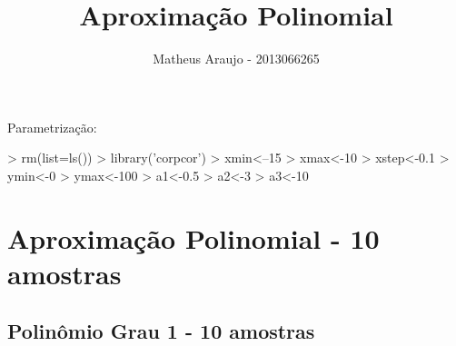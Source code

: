 \documentclass{article}
\begin{document}


\title{Aproximação Polinomial}
\author{Matheus Araujo - 2013066265}
\date{}

\maketitle

Parametrização:

\begin{Schunk}
\begin{Sinput}
>   rm(list=ls())
>   library('corpcor')
>   xmin<--15
>   xmax<-10
>   xstep<-0.1
>   ymin<-0
>   ymax<-100
>   a1<-0.5
>   a2<-3
>   a3<-10
\end{Sinput}
\end{Schunk}

\newpage
\section{Aproximação Polinomial - 10 amostras}

\subsection{Polinômio Grau 1 - 10 amostras}
\end{document}
